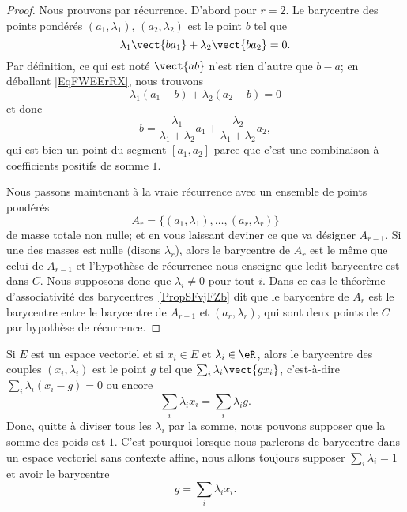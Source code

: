 \begin{proof}
	Nous prouvons par récurrence. D'abord pour \( r=2\). Le barycentre des points pondérés \( (a_1,\lambda_1)\), \( (a_2,\lambda_2)\) est le point \( b\) tel que
	\begin{equation}        \label{EqFWEErRX}
		\lambda_1\vect{ ba_1 }+\lambda_2\vect{ ba_2 }=0.
	\end{equation}
	Par définition, ce qui est noté \( \vect{ ab }\) n'est rien d'autre que \( b-a\); en déballant \eqref{EqFWEErRX}, nous trouvons
	\begin{equation}
		\lambda_1(a_1-b)+\lambda_2(a_2-b)=0
	\end{equation}
	et donc
	\begin{equation}
		b=\frac{ \lambda_1 }{ \lambda_1+\lambda_2 }a_1+\frac{ \lambda_2 }{ \lambda_1+\lambda_2 }a_2,
	\end{equation}
	qui est bien un point du segment \( [a_1,a_2]\) parce que c'est une combinaison à coefficients positifs de somme \( 1\).

	Nous passons maintenant à la vraie récurrence avec un ensemble de points pondérés
	\begin{equation}
		A_r=\{ (a_1,\lambda_1),\ldots, (a_r,\lambda_r) \}
	\end{equation}
	de masse totale non nulle; et en vous laissant deviner ce que va désigner \( A_{r-1}\). Si une des masses est nulle (disons \( \lambda_r\)), alors le barycentre de \( A_r\) est le même que celui de \( A_{r-1}\) et l'hypothèse de récurrence nous enseigne que ledit barycentre est dans \( C\). Nous supposons donc que \( \lambda_i\neq 0\) pour tout \( i\). Dans ce cas le théorème d'associativité des barycentres~\ref{PropSFvjFZb} dit que le barycentre de \( A_r\) est le barycentre entre le barycentre de \( A_{r-1}\) et \( (a_r,\lambda_r)\), qui sont deux points de \( C\) par hypothèse de récurrence.
\end{proof}

Si \( E\) est un espace vectoriel et si \( x_i\in E\) et \( \lambda_i\in \eR\), alors le barycentre des couples \( (x_i,\lambda_i)\) est le point \( g\) tel que \( \sum_i\lambda_i\vect{ gx_i }\), c'est-à-dire \( \sum_i\lambda_i(x_i-g)=0\) ou encore
\begin{equation}
	\sum_i\lambda_ix_i=\sum_i\lambda_ig.
\end{equation}
Donc, quitte à diviser tous les \( \lambda_i\) par la somme, nous pouvons supposer que la somme des poids est \( 1\). C'est pourquoi lorsque nous parlerons de barycentre dans un espace vectoriel sans contexte affine, nous allons toujours supposer \( \sum_i\lambda_i=1\) et avoir le barycentre
\begin{equation}
	g=\sum_i\lambda_ix_i.
\end{equation}

